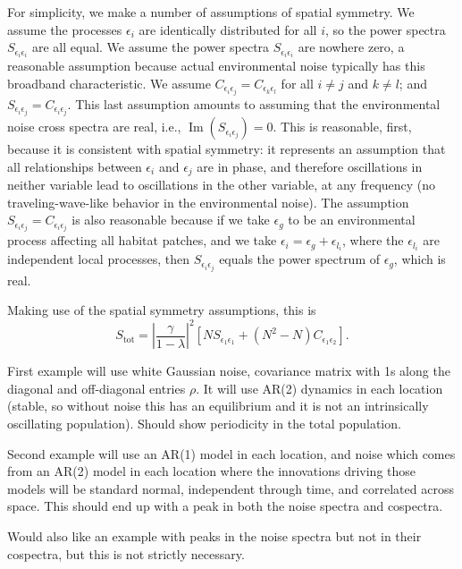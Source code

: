 \documentclass[letterpaper,11pt]{article}
\newcommand{\Ip}{{\operatorname{Im}}}
\begin{document}
For simplicity, we make a number of assumptions of spatial symmetry. We assume
the processes $\epsilon_i$ are identically distributed  for all
$i$, so the power spectra $S_{\epsilon_{i}\epsilon_{i}}$ are all equal.
We assume
the power spectra $S_{\epsilon_{i}\epsilon_{i}}$ are nowhere zero, a reasonable
assumption because actual environmental noise typically has this broadband
characteristic. We assume
$C_{\epsilon_{i}\epsilon_{j}}=C_{\epsilon_{k}\epsilon_{l}}$ for all
$i \neq j$ and $k \neq l$; and $S_{\epsilon_{i}\epsilon_{j}}=C_{\epsilon_{i}\epsilon_{j}}$.
This last assumption amounts to assuming that the environmental noise
cross spectra are real, i.e., $\Ip(S_{\epsilon_{i}\epsilon_{j}})=0$.
This is reasonable, first, because it is consistent with spatial symmetry:
it represents an assumption
that all relationships between $\epsilon_{i}$ and $\epsilon_{j}$
are in phase, and therefore oscillations in neither variable lead to oscillations in the
other variable, at any frequency (no traveling-wave-like behavior
in the environmental noise).
The assumption $S_{\epsilon_{i}\epsilon_{j}}=C_{\epsilon_{i}\epsilon_{j}}$
is also reasonable because if we take $\epsilon_{g}$
to be an environmental process affecting all habitat patches, and we take
$\epsilon_{i}=\epsilon_{g}+\epsilon_{l_i}$, where the $\epsilon_{l_i}$
are independent local processes, then $S_{\epsilon_{i}\epsilon_{j}}$
equals the power spectrum of $\epsilon_{g}$, which is real.


Making use of the spatial symmetry assumptions, this is
\begin{equation}
S_{\text{tot}} = \left| \frac{\gamma}{1-\lambda} \right|^{ 2} \left[ N S_{\epsilon_{ 1}\epsilon_{ 1}} + (N^2-N) C_{\epsilon_{ 1}\epsilon_{ 2}} \right].\label{eq:finalres}
\end{equation}


First example will use white Gaussian noise, covariance matrix with 1s along
the diagonal and off-diagonal entries $\rho$. It will use AR(2) dynamics in each
location (stable, so without noise this has an equilibrium and it is not an
intrinsically oscillating population). Should show periodicity in the total
population.

Second example will use an AR(1) model in each location, and noise which comes
from an AR(2) model in each location where the innovations driving those models
will be standard normal, independent through time, and correlated across space.
This should end up with a peak in both the noise spectra and cospectra.

Would also like an example with peaks in the noise spectra but not in their cospectra,
but this is not strictly necessary.
\end{document}
